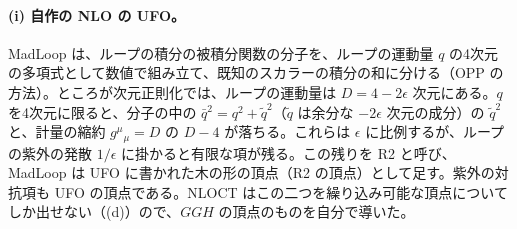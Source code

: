 \documentclass[a4paper,10pt]{ltjsarticle}
\begin{document}
\paragraph{(i) 自作の NLO の UFO。}MadLoop は、ループの積分の被積分関数の分子を、ループの運動量 $q$ の4次元の多項式として数値で組み立て、既知のスカラーの積分の和に分ける（OPP の方法）。ところが次元正則化では、ループの運動量は $D=4-2\epsilon$ 次元にある。$q$ を4次元に限ると、分子の中の $\bar q^2=q^2+\tilde q^2$（$\tilde q$ は余分な $-2\epsilon$ 次元の成分）の $\tilde q^2$ と、計量の縮約 $g^\mu{}_\mu=D$ の $D-4$ が落ちる。これらは $\epsilon$ に比例するが、ループの紫外の発散 $1/\epsilon$ に掛かると有限な項が残る。この残りを R2 と呼び、MadLoop は UFO に書かれた木の形の頂点（R2 の頂点）として足す。紫外の対抗項も UFO の頂点である。NLOCT はこの二つを繰り込み可能な頂点についてしか出せない（(d)）ので、$GGH$ の頂点のものを自分で導いた。
\end{document}
